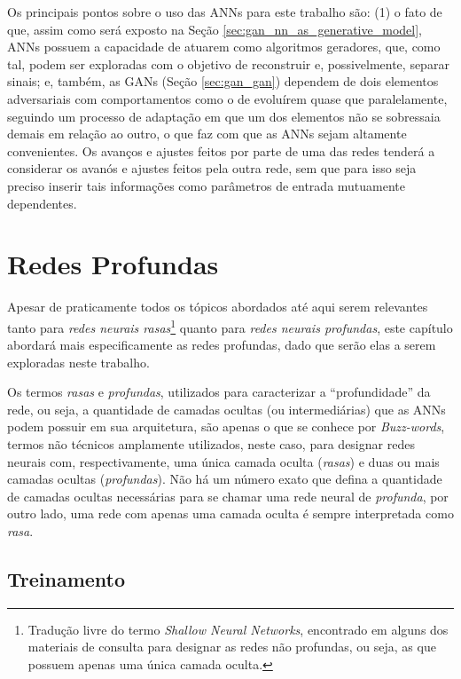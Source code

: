 Os principais pontos sobre o uso das ANNs para este trabalho são: (1) o fato de que, assim como será exposto na Seção \ref{sec:gan_nn_as_generative_model}, ANNs possuem a capacidade de atuarem como algoritmos geradores, que, como tal, podem ser exploradas com o objetivo de reconstruir e, possivelmente, separar sinais; e, também, as GANs (Seção \ref{sec:gan_gan}) dependem de dois elementos adversariais com comportamentos como o de evoluírem quase que paralelamente, seguindo um processo de adaptação em que um dos elementos não se sobressaia demais em relação ao outro, o que faz com que as ANNs sejam altamente convenientes. Os avanços e ajustes feitos por parte de uma das redes tenderá a considerar os avanós e ajustes feitos pela outra rede, sem que para isso seja preciso inserir tais informações como parâmetros de entrada mutuamente dependentes.


\section{Redes Profundas}
\label{sec:ann_deep_networks}

Apesar de praticamente todos os tópicos abordados até aqui serem relevantes tanto para \textit{redes neurais rasas}\footnote{Tradução livre do termo \textit{Shallow Neural Networks}, encontrado em alguns dos materiais de consulta para designar as redes não profundas, ou seja, as que possuem apenas uma única camada oculta.} quanto para \textit{redes neurais profundas}, este capítulo abordará mais especificamente as redes profundas, dado que serão elas a serem exploradas neste trabalho.

Os termos \textit{rasas} e \textit{profundas}, utilizados para caracterizar a ``profundidade'' da rede, ou seja, a quantidade de camadas ocultas (ou intermediárias) que as ANNs podem possuir em sua arquitetura, são apenas o que se conhece por \textit{Buzz-words}, termos não técnicos amplamente utilizados, neste caso, para designar redes neurais com, respectivamente, uma única camada oculta (\textit{rasas}) e duas ou mais camadas ocultas (\textit{profundas}). Não há um número exato que defina a quantidade de camadas ocultas necessárias para se chamar uma rede neural de \textit{profunda}, por outro lado, uma rede com apenas uma camada oculta é sempre interpretada como \textit{rasa}.



\subsection{Treinamento}
\label{subsec:ann_training}

